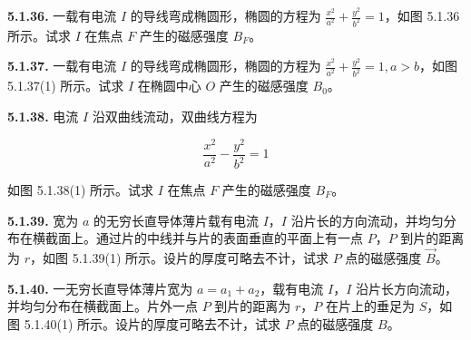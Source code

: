 \begin{center}
\end{center}

\vfill
\newpage

\textbf{5.1.36.} 一载有电流 $I$ 的导线弯成椭圆形，椭圆的方程为 $\displaystyle \frac{x^{2}}{a^{2}} + \frac{y^{2}}{b^{2}} = 1$，如图 5.1.36 所示。试求 $I$ 在焦点 $F$ 产生的磁感强度 $B_{F}$。

\begin{center}
\end{center}

\vfill
\newpage

\textbf{5.1.37.} 一载有电流 $I$ 的导线弯成椭圆形，椭圆的方程为 $\displaystyle \frac{x^{2}}{a^{2}} + \frac{y^{2}}{b^{2}} = 1, a > b$，如图 5.1.37(1) 所示。试求 $I$ 在椭圆中心 $O$ 产生的磁感强度 $B_{0}$。

\begin{center}
\end{center}

\vfill
\newpage

\textbf{5.1.38.} 电流 $I$ 沿双曲线流动，双曲线方程为

\[
\frac{x^{2}}{a^{2}} - \frac{y^{2}}{b^{2}} = 1
\]

如图 5.1.38(1) 所示。试求 $I$ 在焦点 $F$ 产生的磁感强度 $B_{F}$。

\begin{center}
\end{center}

\vfill
\newpage

\textbf{5.1.39.} 宽为 $a$ 的无穷长直导体薄片载有电流 $I$，$I$ 沿片长的方向流动，并均匀分布在横截面上。通过片的中线并与片的表面垂直的平面上有一点 $P$，$P$ 到片的距离为 $r$，如图 5.1.39(1) 所示。设片的厚度可略去不计，试求 $P$ 点的磁感强度 $\vec{B}$。

\begin{center}
\end{center}

\vfill
\newpage

\textbf{5.1.40.} 一无穷长直导体薄片宽为 $a = a_{1} + a_{2}$，载有电流 $I$，$I$ 沿片长方向流动，并均匀分布在横截面上。片外一点 $P$ 到片的距离为 $r$，$P$ 在片上的垂足为 $S$，如图 5.1.40(1) 所示。设片的厚度可略去不计，试求 $P$ 点的磁感强度 $B$。

